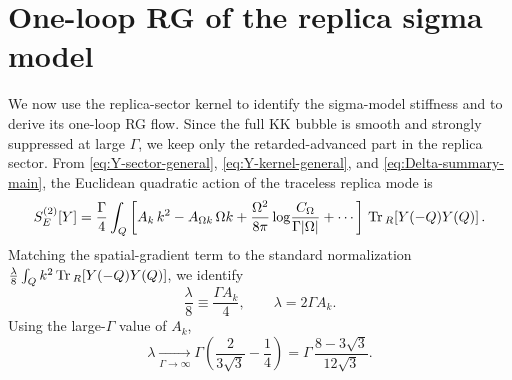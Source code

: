 \documentclass[aps,prx,preprint,amsmath,amssymb]{revtex4-2}
\newcommand{\Tr}{{\rm \, Tr\,}}
\begin{document}
\section{One-loop RG of the replica sigma model}

We now use the replica-sector kernel to identify the sigma-model stiffness and
to derive its one-loop RG flow.  Since the full KK bubble is smooth and strongly
suppressed at large \(\Gamma\), we keep only the retarded-advanced part in the
replica sector.  From \eqref{eq:Y-sector-general}, \eqref{eq:Y-kernel-general},
and \eqref{eq:Delta-summary-main}, the Euclidean quadratic action of the
traceless replica mode is
\begin{equation}\label{eq:SE-Y-quadratic}
S_E^{(2)}[Y]
=
\frac{\Gamma}{4}\int_Q
\left[
A_k\,k^2
-A_{\Omega k}\,\Omega k
+\frac{\Omega^2}{8\pi}\log\!\frac{C_\Omega}{\Gamma|\Omega|}
+\cdots
\right]
\Tr_R\!\left[Y(-Q)Y(Q)\right].
\end{equation}
Matching the spatial-gradient term to the standard normalization
\(\frac{\lambda}{8}\int_Q k^2 \Tr_R[Y(-Q)Y(Q)]\), we identify
\begin{equation}\label{eq:lambda-def}
\frac{\lambda}{8}\equiv \frac{\Gamma A_k}{4},
\qquad
\lambda=2\Gamma A_k.
\end{equation}
Using the large-\(\Gamma\) value of \(A_k\),
\begin{equation}\label{eq:lambda-micro}
\lambda
\xrightarrow[\Gamma\to\infty]{}
\Gamma\left(\frac{2}{3\sqrt{3}}-\frac{1}{4}\right)
=
\Gamma\,\frac{8-3\sqrt{3}}{12\sqrt{3}}.
\end{equation}
\end{document}
